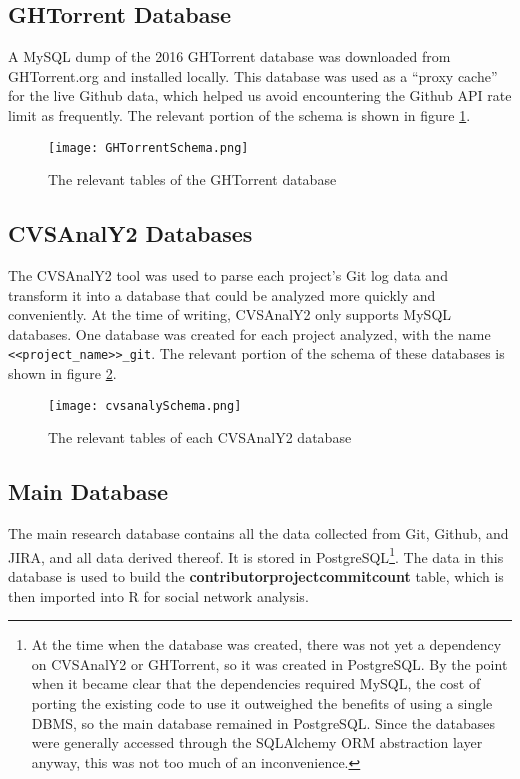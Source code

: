 \subsection{GHTorrent Database}
A MySQL dump of the 2016 GHTorrent database was downloaded from GHTorrent.org and installed locally. This database was used as a ``proxy cache'' for the live Github data, which helped us avoid encountering the Github API rate limit as frequently. The relevant portion of the schema is shown in figure \ref{fig:ghtorrentSchema}.
\begin{figure}
	\texttt{[image: GHTorrentSchema.png]}
	\centering
	\caption{The relevant tables of the GHTorrent database }
	\label{fig:ghtorrentSchema}
\end{figure}
\subsection{CVSAnalY2 Databases}
 The CVSAnalY2 tool\cite{cvsanaly} was used to parse each project's Git log data and transform it into a database that could be analyzed more quickly and conveniently. At the time of writing, CVSAnalY2 only supports MySQL databases. One database was created for each project analyzed, with the name \verb|<<project_name>>_git|. The relevant portion of the schema of these databases is shown in figure \ref{fig:cvsanalySchema}.
\begin{figure}
	\texttt{[image: cvsanalySchema.png]}
	\centering
	\caption{The relevant tables of each CVSAnalY2 database}
	\label{fig:cvsanalySchema}
\end{figure}
\subsection{Main Database}
The main research database contains all the data collected from Git, Github, and JIRA, and all data derived thereof. It is stored in PostgreSQL\footnote{At the time when the database was created, there was not yet a dependency on CVSAnalY2 or GHTorrent, so it was created in PostgreSQL. By the point when it became clear that the dependencies required MySQL, the cost of porting the existing code to use it outweighed the benefits of using a single DBMS, so the main database remained in PostgreSQL. Since the databases were generally accessed through the SQLAlchemy ORM abstraction layer anyway, this was not too much of an inconvenience.}. The data in this database is used to build the \textbf{contributorprojectcommitcount} table, which is then imported into R for social network analysis.

